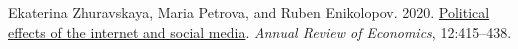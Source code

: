 \documentclass[11pt,a4paper]{article}
\begin{document}
\begin{thebibliography}{25}
    Ekaterina Zhuravskaya, Maria Petrova, and Ruben Enikolopov. 2020.
    \newblock \href {https://doi.org/10.1146/annurev-economics-081919-050239}
      {Political effects of the internet and social media}.
    \newblock \emph{Annual Review of Economics}, 12:415--438.
    
    \end{thebibliography}
    

\appendix
\end{document}
